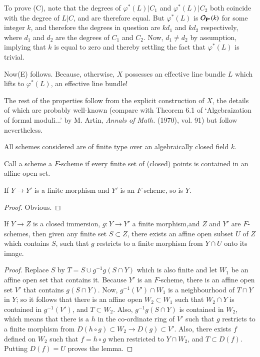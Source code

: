 To prove (C), note that the degrees of $\varphi^*(L)|C_1$ and $\varphi^*(L)|C_2$ both coincide with the degree of $L|C$, and are therefore equal. But $\varphi^*(L)$ is $\mathcal{O}_{\mathbf{P}^n} (k)$ for some integer $k$, and therefore the degrees in question are $kd_1$ and $kd_2$ respectively, where $d_1$ and $d_2$ are the degrees of $C_1$ and $C_2 $. Now, $d_1 \neq d_2$ by assumption, implying that $k$ is equal to zero and thereby settling the fact that $\varphi^* (L)$ is trivial.

Now\pageoriginale (E) follows. Because, otherwise, $X$ possesses an effective line bundle $L$ which lifts to $\varphi^*(L)$, an effective line bundle!
 
The rest of the properties follow from the explicit construction of $X$, the details of which are probably well-known (compare with Theorem 6.1 of `Algebraization of formal moduli...' by M. Artin, {\em Annals of Math.} (1970), vol. 91) but follow nevertheless.

All schemes considered are of finite type over an algebraically closed field $k$.

Call a scheme a $F$-scheme if every finite set of (closed) points is contained in an affine open set.

\begin{lem}\label{art19-lem1}
If $Y \to Y'$ is a finite morphism and $Y'$ is an $F$-scheme, so is $Y$.
\end{lem}

\begin{proof}
Obvious.
\end{proof}

\begin{lem}\label{art19-lem2}
If $Y \to Z$ is a closed immersion, $g: Y \to Y'$ a finite morphism,and $Z$ and $Y'$ are $F$-schemes, then given any finite set $S \subset Z$, there exists an affine open subset $U$ of $Z$ which contains $S$, such that $g$ restricts to a finite morphism from $Y \cap U$ onto its image.
\end{lem}

\begin{proof}
Replace $S$ by $T = S \cup g^{-1} g(S \cap Y)$ which is also finite and let $W_1$ be an affine open set that contains it. Because $Y'$ is an $F$-scheme, there is an affine open set $V'$ that contains $g(S \cap Y)$. Now, $g^{-1}(V') \cap W_1$ is a neighbourhood of $T \cap Y$ in $Y$; so it follows that there is an affine open $W_2 \subset W_1$ such that $W_2 \cap Y$ is contained in $g^{-1}(V')$, and $T \subset W_2$. Also, $g^{-1} g(S \cap Y)$ is contained in $W_2$, which means that there is a $h$ in the co-ordinate ring of $V'$ such that $g$ restricts to a finite morphism from $D(h \circ g) \subset W_2 \to D (g) \subset V'$. Also, there exists $f$ defined on $W_2$ such that $f = h \circ g$ when restricted to $Y \cap W_2$, and $T \subset D (f)$. Putting $D(f) = U$ proves the lemma.
\end{proof}

